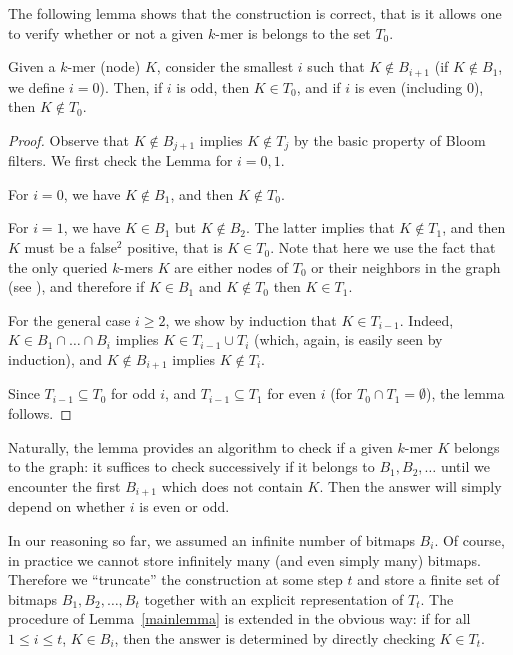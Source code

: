 \documentclass[pdftex]{llncs}\usepackage[T1]{fontenc}
\begin{document}
The following lemma shows that the construction is correct, that is it allows one to verify whether or not a given $k$-mer is belongs to the set $T_0$.

\begin{lemma}
\label{mainlemma}
Given a $k$-mer (node) $K$, consider the smallest $i$ such that $K \not\in B_{i+1}$ (if $K \not\in B_1$, we define $i=0$).
Then, if $i$ is odd, then $K\in T_0$, and if $i$ is even (including $0$), then $K\not\in T_0$.
\end{lemma}
\begin{proof}
Observe that $K\not\in B_{j+1}$ implies $K\not\in T_j$ by the basic property of Bloom filters. We first check the Lemma for $i=0,1$.

For $i=0$,  we have $K \not\in B_1$, and then $K \not\in T_0$.

For $i=1$, we have $K\in B_1$ but $K\not\in B_2$. The latter implies that $K\not\in T_1$, and then $K$ must be a false$^2$ positive, that is $K\in T_0$.
Note that here we use the fact that the only queried $k$-mers $K$ are either nodes of $T_0$ or their neighbors in the graph (see \cite{DBLP:conf/wabi/ChikhiR12}), and therefore if $K\in B_1$ and $K\not\in T_0$ then $K\in T_1$.


For the general case $i \geq 2$, we show by induction that $K\in T_{i-1}$. Indeed, $K\in B_1\cap \ldots\cap B_i$ implies $K\in T_{i-1}\cup T_i$ (which, again, is easily seen by induction),
and $K\not\in B_{i+1}$ implies $K\not\in T_i$.

Since $T_{i-1}\subseteq T_0$ for odd $i$, and $T_{i-1}\subseteq T_1$ for even $i$ (for $T_0\cap T_1=\emptyset$), the lemma follows.
\end{proof}

Naturally, the lemma provides an algorithm to check if a given $k$-mer $K$ belongs to the graph: it suffices to check successively if it belongs to $B_1,B_2,\ldots$ until we encounter the first $B_{i+1}$ which does not contain $K$. Then the answer will simply depend on whether $i$ is even or odd.

In our reasoning so far, we assumed an infinite number of bitmaps $B_i$.
Of course, in practice we cannot store infinitely many (and even simply many) bitmaps. Therefore we ``truncate'' the construction at some step $t$ and store a finite set of bitmaps $B_1, B_2, \ldots,B_t$ together with an explicit representation of $T_t$. The procedure of Lemma~\ref{mainlemma} is extended in the obvious way: if for all $1\leq i \leq t$, $K\in B_i$, then the answer is determined by directly checking $K\in T_t$.
\end{document}
